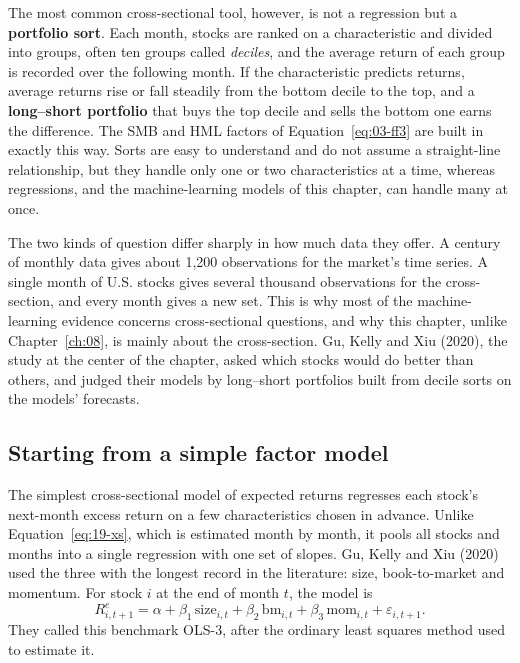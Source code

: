 The most common cross-sectional tool, however, is not a regression but a \textbf{portfolio sort}. Each month, stocks are ranked on a characteristic and divided into groups, often ten groups called \emph{deciles}, and the average return of each group is recorded over the following month. If the characteristic predicts returns, average returns rise or fall steadily from the bottom decile to the top, and a \textbf{long--short portfolio} that buys the top decile and sells the bottom one earns the difference. The SMB and HML factors of Equation~\eqref{eq:03-ff3} are built in exactly this way. Sorts are easy to understand and do not assume a straight-line relationship, but they handle only one or two characteristics at a time, whereas regressions, and the machine-learning models of this chapter, can handle many at once.

The two kinds of question differ sharply in how much data they offer. A century of monthly data gives about 1,200 observations for the market's time series. A single month of U.S. stocks gives several thousand observations for the cross-section, and every month gives a new set. This is why most of the machine-learning evidence concerns cross-sectional questions, and why this chapter, unlike Chapter~\ref{ch:08}, is mainly about the cross-section. Gu, Kelly and Xiu (2020), the study at the center of the chapter, asked which stocks would do better than others, and judged their models by long--short portfolios built from decile sorts on the models' forecasts.

\subsection{Starting from a simple factor model}
\label{sec:19-simple}

The simplest cross-sectional model of expected returns regresses each stock's next-month excess return on a few characteristics chosen in advance. Unlike Equation~\eqref{eq:19-xs}, which is estimated month by month, it pools all stocks and months into a single regression with one set of slopes. Gu, Kelly and Xiu (2020) used the three with the longest record in the literature: size, book-to-market and momentum. For stock $i$ at the end of month $t$, the model is
\begin{equation}
  R^{e}_{i,t+1} = \alpha + \beta_1\,\text{size}_{i,t} + \beta_2\,\text{bm}_{i,t} + \beta_3\,\text{mom}_{i,t} + \varepsilon_{i,t+1}.
  \label{eq:19-ols3}
\end{equation}
They called this benchmark OLS-3, after the ordinary least squares method used to estimate it.

